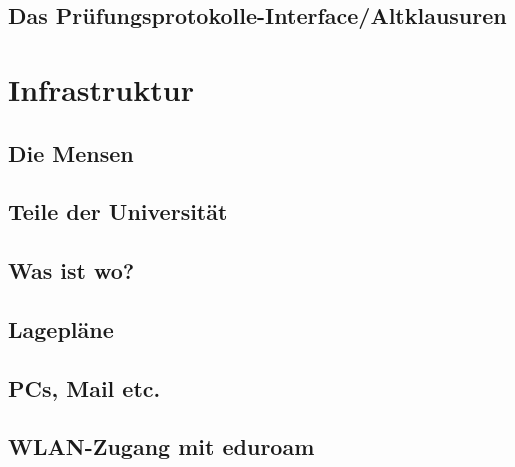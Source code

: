 \documentclass[12pt, a4paper]{article}
\newif\ifinfo
\begin{document}
\subsection{Das Prüfungsprotokolle-Interface/Altklausuren}

\ifinfo
\else
	\vfill
\fi

\ifinfo
	\subsection{Praktika}
	
\fi

\pagebreak

\section{Infrastruktur}
\subsection{Die Mensen}


\subsection{Teile der Universität}
\ifinfo
	
\else
	
\fi

\pagebreak

\subsection{Was ist wo?}
\ifinfo
	
\else
	
\fi

\newpage
\subsection{Lagepläne}
\ifinfo
	
\else
	
\fi
\newpage

\subsection{PCs, Mail etc.}

\subsection{WLAN-Zugang mit eduroam}

\end{document}

